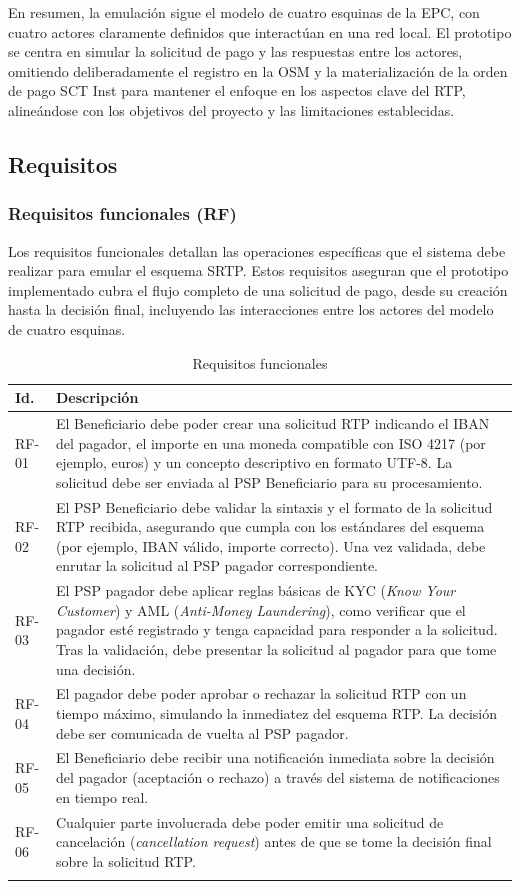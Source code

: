 En resumen, la emulación sigue el modelo de cuatro esquinas de la EPC, con cuatro actores claramente definidos que interactúan en una red local. El prototipo se centra en simular la solicitud de pago y las respuestas entre los actores, omitiendo deliberadamente el registro en la OSM y la materialización de la orden de pago SCT Inst para mantener el enfoque en los aspectos clave del RTP, alineándose con los objetivos del proyecto y las limitaciones establecidas.
\subsection{Requisitos}
\label{subsec:diseno_requisitos}

\subsubsection{Requisitos funcionales (RF)}
Los requisitos funcionales detallan las operaciones específicas que el sistema debe realizar para emular el esquema SRTP. Estos requisitos aseguran que el prototipo implementado cubra el flujo completo de una solicitud de pago, desde su creación hasta la decisión final, incluyendo las interacciones entre los actores del modelo de cuatro esquinas.

\begin{longtable}{@{}>{\raggedright\arraybackslash}p{}p{}@{}}
\toprule
\textbf{Id.} & \textbf{Descripción} \\
\midrule\endhead
RF-01 & El Beneficiario debe poder crear una solicitud RTP indicando el IBAN del pagador, el importe en una moneda compatible con ISO 4217 (por ejemplo, euros) y un concepto descriptivo en formato UTF-8. La solicitud debe ser enviada al PSP Beneficiario para su procesamiento. \\
RF-02 & El PSP Beneficiario debe validar la sintaxis y el formato de la solicitud RTP recibida, asegurando que cumpla con los estándares del esquema (por ejemplo, IBAN válido, importe correcto). Una vez validada, debe enrutar la solicitud al PSP pagador correspondiente. \\
RF-03 & El PSP pagador debe aplicar reglas básicas de \textsc{KYC} (\emph{Know Your Customer}) y \textsc{AML} (\emph{Anti-Money Laundering}), como verificar que el pagador esté registrado y tenga capacidad para responder a la solicitud. Tras la validación, debe presentar la solicitud al pagador para que tome una decisión. \\
RF-04 & El pagador debe poder aprobar o rechazar la solicitud RTP con un tiempo máximo, simulando la inmediatez del esquema RTP. La decisión debe ser comunicada de vuelta al PSP pagador. \\
RF-05 & El Beneficiario debe recibir una notificación inmediata sobre la decisión del pagador (aceptación o rechazo) a través del sistema de notificaciones en tiempo real. \\
RF-06 & Cualquier parte involucrada debe poder emitir una solicitud de cancelación (\emph{cancellation request}) antes de que se tome la decisión final sobre la solicitud RTP. \\
\bottomrule
\caption{Requisitos funcionales}
\label{tab:RF}
\end{longtable}

